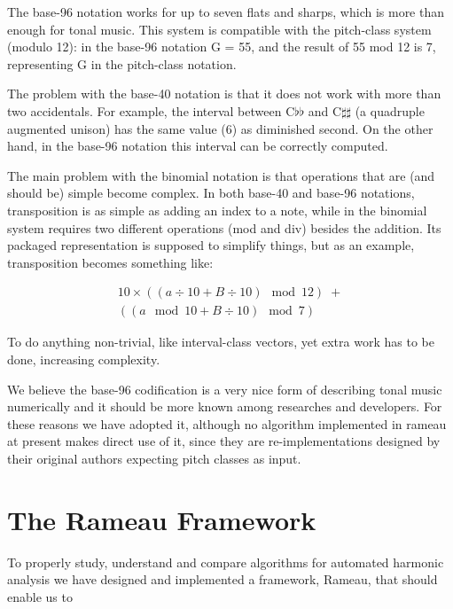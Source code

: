 \documentclass{article}
\newcounter{notacounter}
\newcommand{\nota}[1]{
  \addtocounter{notacounter}{1}
  \textcolor{red}{[nota \arabic{notacounter}: #1]}
}
\begin{document}
The base-96 notation works for up to seven flats and sharps, which is
more than enough for tonal music. This system is compatible with the
pitch-class system (modulo 12): in the base-96 notation G = 55, and
the result of 55 mod 12 is 7, representing G in the pitch-class
notation. 

The problem with the base-40 notation is that it does not work with
more than two accidentals. For example, the interval between
C$\flat\flat$ and C$\sharp\sharp$ (a quadruple augmented unison) has
the same value (6) as diminished second. On the other hand, in the
base-96 notation this interval can be correctly computed.

The main problem with the binomial notation is that operations that
are (and should be) simple become complex. In both base-40 and base-96
notations, transposition is as simple as adding an index to a note,
while in the binomial system requires two different operations (mod
and div) besides the addition. Its packaged representation is supposed
to simplify things, but as an example, transposition becomes something
like:

\begin{eqnarray}
10\times((a \div 10 + B \div 10) \mod 12)\; + \nonumber \\
((a \mod 10 + B \div 10) \mod 7)
\end{eqnarray}

To do anything non-trivial, like interval-class vectors, yet extra
work has to be done, increasing complexity.

We believe the base-96 codification is a very nice form of describing
tonal music numerically and it should be more known among researches
and developers. For these reasons we have adopted it, although no
algorithm implemented in rameau at present makes direct use of it,
since they are re-implementations designed by their original authors
expecting pitch classes as input. 

\section{The Rameau Framework}
\label{sec:system}

To properly study, understand and compare algorithms for automated
harmonic analysis we have designed and implemented a framework,
Rameau, that should enable us to
\end{document}
